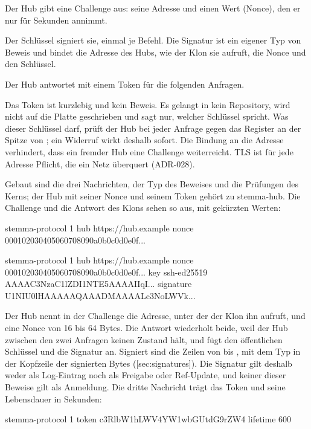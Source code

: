 \startitemize[n]
\item Der Hub gibt eine Challenge aus: seine Adresse und einen Wert (Nonce), den er nur für
Sekunden annimmt.
\item Der Schlüssel signiert sie, einmal je Befehl.
Die Signatur ist ein eigener Typ von Beweis und bindet die Adresse des Hubs, wie der Klon sie
aufruft, die Nonce und den Schlüssel.
\item Der Hub antwortet mit einem Token für die folgenden Anfragen.
\stopitemize

Das Token ist kurzlebig und kein Beweis.
Es gelangt in kein Repository, wird nicht auf die Platte geschrieben und sagt nur, welcher
Schlüssel spricht.
Was dieser Schlüssel darf, prüft der Hub bei jeder Anfrage gegen das Register an der Spitze von
; ein Widerruf wirkt deshalb sofort.
Die Bindung an die Adresse verhindert, dass ein fremder Hub eine Challenge weiterreicht.
TLS ist für jede Adresse Pflicht, die ein Netz überquert (ADR-028).

Gebaut sind die drei Nachrichten, der Typ des Beweises und die Prüfungen des Kerns; der Hub mit
seiner Nonce und seinem Token gehört zu stemma-hub.
Die Challenge und die Antwort des Klons sehen so aus, mit gekürzten Werten:

\starttyping
stemma-protocol 1
hub https://hub.example
nonce 000102030405060708090a0b0c0d0e0f...

stemma-protocol 1
hub https://hub.example
nonce 000102030405060708090a0b0c0d0e0f...
key ssh-ed25519 AAAAC3NzaC1lZDI1NTE5AAAAIIqI...
signature U1NIU0lHAAAAAQAAADMAAAALc3NoLWVk...
\stoptyping

Der Hub nennt in der Challenge die Adresse, unter der der Klon ihn aufruft, und eine Nonce von 16
bis 64 Bytes.
Die Antwort wiederholt beide, weil der Hub zwischen den zwei Anfragen keinen Zustand hält,
und fügt den öffentlichen Schlüssel und die Signatur an.
Signiert sind die Zeilen von  bis , mit dem Typ  in der
Kopfzeile der signierten Bytes ([sec:signatures]).
Die Signatur gilt deshalb weder als Log-Eintrag noch als Freigabe oder Ref-Update, und keiner
dieser Beweise gilt als Anmeldung.
Die dritte Nachricht trägt das Token und seine Lebensdauer in Sekunden:

\starttyping
stemma-protocol 1
token c3RlbW1hLWV4YW1wbGUtdG9rZW4
lifetime 600
\stoptyping

